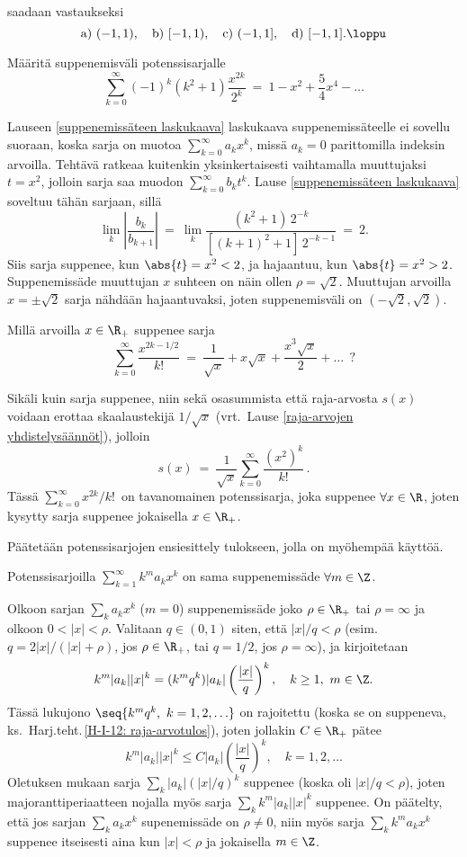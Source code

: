 saadaan vastaukseksi
\[
\text{a)}\ (-1,1), \quad \text{b)}\ [-1,1), \quad \text{c)}\ (-1,1], 
\quad \text{d)}\ [-1,1]. \loppu
\]
\begin{Exa} Määritä suppenemisväli potenssisarjalle
\[
\sum_{k=0}^\infty (-1)^k (k^2+1) \dfrac{x^{2k}}{2^k}\ =\ 1 - x^2 + \dfrac{5}{4} x^4 - \ldots
\]
\end{Exa}
\ratk Lauseen \ref{suppenemissäteen laskukaava} laskukaava suppenemissäteelle ei sovellu 
suoraan, koska sarja on muotoa $\sum_{k=0}^\infty a_k x^k$, missä $a_k = 0$ parittomilla 
indeksin arvoilla. Tehtävä ratkeaa kuitenkin yksinkertaisesti vaihtamalla muuttujaksi $t=x^2$,
jolloin sarja saa muodon $\sum_{k=0}^\infty b_k t^k$. Lause \ref{suppenemissäteen laskukaava}
soveltuu tähän sarjaan, sillä
\[
\lim_k \left|\dfrac{b_k}{b_{k+1}}\right|\ 
               =\ \lim_k \dfrac{(k^2 +1)\,2^{-k}}{[(k+1)^2 + 1]\,2^{-k-1}}\ =\ 2.
\]
Siis sarja suppenee, kun $\abs{t} = x^2 < 2$, ja hajaantuu, kun $\abs{t} = x^2 > 2$. 
Suppenemissäde muuttujan $x$ suhteen on näin ollen $\rho = \sqrt{2}$. Muuttujan arvoilla 
$x=\pm\sqrt{2}$ sarja nähdään hajaantuvaksi, joten suppenemisväli on $(-\sqrt{2},\sqrt{2})$.
\loppu
\begin{Exa} Millä arvoilla $x \in \R_+$ suppenee sarja 
\[ 
\sum_{k=0}^\infty \dfrac{x^{2k-1/2}}{k!}\ 
          =\ \dfrac{1}{\sqrt{x}} + x\sqrt{x} + \dfrac{x^3\sqrt{x}}{2} + \ldots \ \ ?
\]
\end{Exa}
\ratk Sikäli kuin sarja suppenee, niin sekä osasummista että raja-arvosta $s(x)$ voidaan
erottaa skaalaustekijä $1/\sqrt{x}$ (vrt.\ Lause \ref{raja-arvojen yhdistelysäännöt}),
jolloin
\[
s(x)\ =\ \dfrac{1}{\sqrt{x}} \sum_{k=0}^\infty \dfrac{(x^2)^k}{k!}\,.
\]
Tässä $\sum_{k=0}^\infty x^{2k}/k!\,$ on tavanomainen potenssisarja, joka suppenee 
$\forall x\in\R$, joten kysytty sarja suppenee jokaisella $x \in \R_+$. \loppu

Päätetään potenssisarjojen ensiesittely tulokseen, jolla on myöhempää käyttöä.
\begin{Lause} \label{potenssisarjan skaalaus} Potenssisarjoilla $\sum_{k=1}^\infty k^m a_k x^k$
on sama suppenemissäde $\forall m\in\Z$. 
\end{Lause}
\tod Olkoon sarjan $\sum_ka_kx^k$ ($m=0$) suppenemissäde joko $\rho\in\R_+$ tai $\rho=\infty$
ja olkoon $0<|x|<\rho$. Valitaan $q\in(0,1)$ siten, että $|x|/q<\rho$ 
(esim.\ $q=2|x|/(|x|+\rho)$, jos $\rho\in\R_+$, tai $q=1/2$, jos $\rho=\infty$), ja
kirjoitetaan
\[
k^m|a_k||x|^k = (k^mq^k)|a_k|\left(\frac{|x|}{q}\right)^k, \quad k \ge 1,\ m\in\Z.
\]
Tässä lukujono $\seq{k^mq^k,\ k=1,2,\ldots}$ on rajoitettu (koska se on suppeneva, ks.\
Harj.teht.\,\ref{H-I-12: raja-arvotulos}), joten jollakin $C\in\R_+$ pätee
\[
k^m|a_k||x|^k \le C|a_k|\left(\frac{|x|}{q}\right)^k, \quad k=1,2,\ldots
\]
Oletuksen mukaan sarja $\sum_k|a_k|(|x|/q)^k$ suppenee (koska oli $|x|/q<\rho$), joten
majoranttiperiaatteen nojalla myös sarja $\sum_kk^m|a_k||x|^k$ suppenee. On päätelty, että jos
sarjan $\sum_ka_kx^k$ supenemissäde on $\rho \neq 0$, niin myös sarja $\sum_kk^ma_kx^k$
suppenee itseisesti aina kun $|x|<\rho$ ja jokaisella $m\in\Z$.

